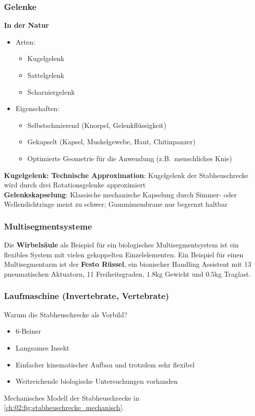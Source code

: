 \subsubsection{Gelenke}
\textbf{In der Natur}
\begin{itemize}
	\item Arten:
	\begin{itemize}
		\item Kugelgelenk
		\item Sattelgelenk
		\item Scharniergelenk
	\end{itemize}
	\item Eigenschaften:
	\begin{itemize}
		\item Selbstschmierend (Knorpel, Gelenkflüssigkeit)
		\item Gekapselt (Kapsel, Muskelgewebe, Haut, Chitinpanzer)
		\item Optimierte Geometrie für die Anwendung (z.B.\ menschliches Knie)
	\end{itemize}
\end{itemize}
\textbf{Kugelgelenk: Technische Approximation}:
Kugelgelenk der Stabheuschrecke wird durch drei Rotationsgelenke approximiert \\
\textbf{Gelenkskapselung}: Klassische mechanische Kapselung durch Simmer- oder Wellendichtringe meist zu schwer; Gummimembrane nur begrenzt haltbar

\subsubsection{Multisegmentsysteme}
Die \textbf{Wirbelsäule} als Beispiel für ein biologisches Multisegmentsystem ist ein flexibles System mit vielen gekoppelten Einzelelementen.
Ein Beispiel für einen Multisegmentarm ist der \textbf{Festo Rüssel}, ein bionischer Handling Assistent mit 13 pneumatischen Aktuatorn, 11 Freiheitsgraden, $1.8$kg Gewicht und $0.5$kg Traglast. %

\subsubsection{Laufmaschine (Invertebrate, Vertebrate)}
Warum die Stabheuschrecke als Vorbild?
\begin{itemize}
	\item 6-Beiner
	\item Langsames Insekt
	\item Einfacher kinematischer Aufbau und trotzdem sehr flexibel
	\item Weitreichende biologische Untersuchungen vorhanden
\end{itemize}
Mechanisches Modell der Stabheuschrecke in \autoref{ch:02:fig:stabheuschrecke_mechanisch}. %


